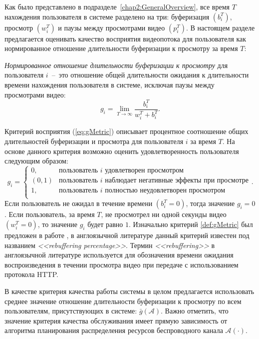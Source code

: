 Как было представлено в подразделе~\ref{chap2:GeneralOverview}, все время $T$ нахождения пользователя в системе разделено на три: буферизация $\left( b_i^T \right)$, просмотр $\left( w_i^T \right)$ и паузы между просмотрами видео $\left( p_i^T \right)$. В настоящем разделе предлагается оценивать качество восприятия видеопотока для пользователя как нормированное отношение длительности буферизации к просмотру за время $T$:
\begin{definition}
\label{def:gMetric}
    \emph{Нормированное отношение длительности буферизации к просмотру} для пользователя $i$~--~это отношение общей длительности ожидания к длительности времени нахождения пользователя в системе, исключая паузы между просмотрами видео:
    \emph{
    \begin{equation}
    	\label{eq:gMetric}
		g_i = \lim\limits_{T\rightarrow\infty} \frac{b_i^T}{w_i^T + b_i^T}.
	\end{equation}
	}
\end{definition}

Критерий восприятия (\ref{eq:gMetric}) описывает процентное соотношение общих длительностей буферизации и просмотра для пользователя $i$ за время $T$. На основе данного критерия возможно оценить удовлетворенность пользователя следующим образом:
$$g_i=
\begin{cases}
0, & \text{пользователь $i$ удовлетворен просмотром}\\
(0,1) & \text{пользователь $i$ наблюдает негативные эффекты при просмотре}\\
1, & \text{пользователь $i$ полностью неудовлетворен просмотром}\\
\end{cases}.
$$
Если пользователь не ожидал в течение времени $\left(b_i^T = 0\right)$, тогда значение $g_i = 0$.
Если пользователь, за время $T$, не просмотрел ни одной секунды видео $\left(w_i^T = 0\right)$, то значение $g_i$ будет равно $1$. Изначально критерий \ref{def:gMetric} был предложен в работе \cite{QoE_enhancement}, в англоязычной литературе данный критерий известен под названием \textit{<<rebuffering percentage>>}. Термин \textit{<<rebuffering>>} в англоязычной литературе используется для обозначения времени ожидания воспроизведения в течении просмотра видео при передаче с использованием протокола HTTP.

В качестве критерия качества работы системы в целом предлагается использовать среднее значение отношение длительности буферизации к просмотру по всем пользователям, присутствующих в системе: $\bar{g}\left(\mathcal{A}\right)$. Важно отметить, что значение критерия качества обслуживания имеет прямую зависимость от алгоритма планирования распределения ресурсов беспроводного канала $\mathcal{A}(\cdot)$.

